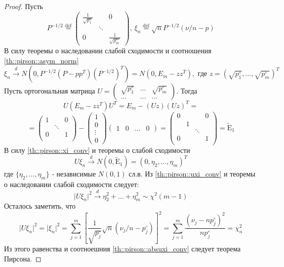\documentclass[12pt]{article}
\theoremstyle{basic_theorem}
\theoremstyle{name_theorem}
\newcommand*{\defeq}{\stackrel{\text{def}}{=}}
\def\E{ \mathrm{E} }
\begin{document}
\begin{proof}
    Пусть
    \[P^{-1/2}\defeq\begin{pmatrix}
        \frac{1}{\sqrt{p_1^\circ}} & & 0 \\
            & \ddots & \\
        0 & & \frac{1}{\sqrt{p_m^\circ}}
    \end{pmatrix},\
    \xi_n\defeq\sqrt{n}P^{-1/2}(\nu/n-p)
    \]
    В силу теоремы о наследовании слабой сходимости и соотношения \eqref{th::pirson::asym_norm}
    \begin{equation} \label{th::pirson::xi_conv}
        \xi_n\xrightarrow{d}N(0, P^{-1/2}(P-pp^T)(P^{-1/2})^T)=N(0, E_m-zz^T),\text{ где } z=(\sqrt{p_1^\circ},\ldots,\sqrt{p_m^\circ})^T
    \end{equation}
    Пусть ортогональная матрица $U=\begin{pmatrix}
        \sqrt{p_1^\circ} & \ldots & \sqrt{p_m^\circ} \\
        \ldots & \ldots & \ldots
    \end{pmatrix}$. Тогда
    \[U(E_m-zz^T)U^T=E_m-(Uz)(Uz)^T=\]
    \[=\begin{pmatrix}
        1 &        & 0 \\
            & \ddots &   \\
        0 &        & 1 \\
    \end{pmatrix}-\begin{pmatrix}
        1 \\ 0 \\ \vdots \\ 0
    \end{pmatrix}\begin{pmatrix}
        1  & 0  & \ldots  & 0
    \end{pmatrix}=\begin{pmatrix}
        0 &   &        & 0 \\
            & 1 &        &   \\
            &   & \ddots &   \\
        0 &   &        & 1 \\
    \end{pmatrix}=\widetilde{\E}_1\]
    В силу \eqref{th::pirson::xi_conv} и теоремы о слабой сходимости
    \begin{equation} \label{th::pirson::uxi_conv}
        U\xi_n\xrightarrow{d}N(0,\widetilde{\E}_1) = (0,\eta_2,\ldots,\eta_m)^T
    \end{equation}
    где $\{\eta_2,\ldots,\eta_m\}$ - независимые $N(0,1)$ сл.в. Из \eqref{th::pirson::uxi_conv}
    и теоремы о наследовании слабой сходимости следует:
    \begin{equation}\label{th::pirson::absuxi_conv}
        \lvert U\xi_n\rvert^2\xrightarrow{d} \eta_2^2+\ldots+\eta_m^2\sim\chi^2(m-1)
    \end{equation}
    Осталось заметить, что
    \[\lvert U\xi_n\rvert^2=\lvert\xi_n\rvert^2=\sum_{j=1}^m\left[\frac{1}{\sqrt{p_j^\circ}}\sqrt{n}(\nu_j/n-p_j^\circ)\right]^2=\sum_{j=1}^m\frac{(\nu_j-np_j^\circ)^2}{np_j^\circ}=\chi_n^2\]
    Из этого равенства и соотноешния \eqref{th::pirson::absuxi_conv} следует теорема Пирсона.
\end{proof}
\end{document}
